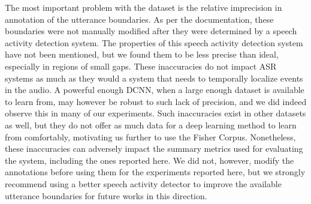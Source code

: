 \documentclass[a4paper]{article}
\begin{document}
The most important problem with the dataset is the relative imprecision in annotation of the utterance boundaries.
As per the documentation,
these boundaries were not manually modified after they were determined by a speech activity detection system.   %
The properties of this speech activity detection system have not been mentioned,
but we found them to be less precise than ideal, especially in regions of small gaps.
These inaccuracies do not impact ASR systems as much as they would a system that needs to temporally localize events in the audio.
A powerful enough DCNN, when a large enough dataset is available to learn from,
may however be robust to such lack of precision,
and we did indeed observe this in many of our experiments.
Such inaccuracies exist in other datasets as well,
but they do not offer as much data for a deep learning method to learn from comfortably,
motivating us further to use the Fisher Corpus.
Nonetheless, these inaccuracies can adversely impact the summary metrics used for evaluating the system, including the ones reported here.
We did not, however, modify the annotations before using them for the experiments reported here,
but we strongly recommend using a better speech activity detector to improve the available utterance boundaries for future works in this direction.




\end{document}
